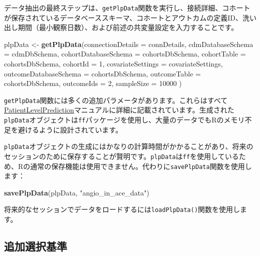 \documentclass[
  11pt]{book}
\newenvironment{Shaded}{\begin{snugshade}}{\end{snugshade}}
\newcommand{\AttributeTok}[1]{\textcolor[rgb]{0.13,0.29,0.53}{#1}}
\newcommand{\DecValTok}[1]{\textcolor[rgb]{0.00,0.00,0.81}{#1}}
\newcommand{\FunctionTok}[1]{\textcolor[rgb]{0.13,0.29,0.53}{\textbf{#1}}}
\newcommand{\NormalTok}[1]{#1}
\newcommand{\OtherTok}[1]{\textcolor[rgb]{0.56,0.35,0.01}{#1}}
\newcommand{\StringTok}[1]{\textcolor[rgb]{0.31,0.60,0.02}{#1}}
\theoremstyle{definition}
\theoremstyle{definition}
\theoremstyle{definition}
\theoremstyle{definition}
\theoremstyle{remark}
\begin{document}
データ抽出の最終ステップは、\texttt{getPlpData}関数を実行し、接続詳細、コホートが保存されているデータベーススキーマ、コホートとアウトカムの定義ID、洗い出し期間（最小観察日数）、および前述の共変量設定を入力することです。

\begin{Shaded}
\begin{Highlighting}[]
\NormalTok{plpData }\OtherTok{\textless{}{-}} \FunctionTok{getPlpData}\NormalTok{(}\AttributeTok{connectionDetails =}\NormalTok{ connDetails,}
                      \AttributeTok{cdmDatabaseSchema =}\NormalTok{ cdmDbSchema,}
                      \AttributeTok{cohortDatabaseSchema =}\NormalTok{ cohortsDbSchema,}
                      \AttributeTok{cohortTable =}\NormalTok{ cohortsDbSchema,}
                      \AttributeTok{cohortId =} \DecValTok{1}\NormalTok{,}
                      \AttributeTok{covariateSettings =}\NormalTok{ covariateSettings,}
                      \AttributeTok{outcomeDatabaseSchema =}\NormalTok{ cohortsDbSchema,}
                      \AttributeTok{outcomeTable =}\NormalTok{ cohortsDbSchema,}
                      \AttributeTok{outcomeIds =} \DecValTok{2}\NormalTok{,}
                      \AttributeTok{sampleSize =} \DecValTok{10000}
\NormalTok{)}
\end{Highlighting}
\end{Shaded}

\texttt{getPlpData}関数には多くの追加パラメータがあります。これらはすべて\href{https://ohdsi.github.io/PatientLevelPrediction/}{PatientLevelPrediction}マニュアルに詳細に記載されています。生成された\texttt{plpData}オブジェクトは\texttt{ff}パッケージを使用し、大量のデータでもRのメモリ不足を避けるように設計されています。

\texttt{plpData}オブジェクトの生成にはかなりの計算時間がかかることがあり、将来のセッションのために保存することが賢明です。\texttt{plpData}は\texttt{ff}を使用しているため、Rの通常の保存機能は使用できません。代わりに\texttt{savePlpData}関数を使用します：

\begin{Shaded}
\begin{Highlighting}[]
\FunctionTok{savePlpData}\NormalTok{(plpData, }\StringTok{"angio\_in\_ace\_data"}\NormalTok{)}
\end{Highlighting}
\end{Shaded}

将来的なセッションでデータをロードするには\texttt{loadPlpData()}関数を使用します。

\subsection{追加選択基準}\label{ux8ffdux52a0ux9078ux629eux57faux6e96}
\end{document}
